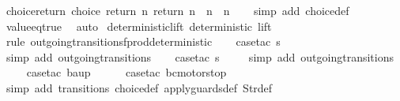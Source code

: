 \begin{isabellebody}
%
\isadelimproof
\isanewline
%
\endisadelimproof
\isanewline
{}\isamarkupfalse%
\ choice{\isacharunderscore}return{\isacharcolon}\ {\isachardoublequoteopen}choice\ {\isacharparenleft}return\ n{\isacharparenright}\ {\isacharparenleft}return\ n{\isacharprime}{\isacharparenright}\ {\isasymLongrightarrow}\ n\ {\isacharequal}\ n{\isacharprime}{\isachardoublequoteclose}\isanewline
%
\isadelimproof
\ \ %
\endisadelimproof
%
\isatagproof
{}\isamarkupfalse%
\ {\isacharparenleft}simp\ add{\isacharcolon}\ choice{\isacharunderscore}def{\isacharparenright}\isanewline
\ \ \isamarkupfalse%
\ value{\isacharunderscore}eq{\isacharunderscore}true\ \isamarkupfalse%
\ auto%
\endisatagproof
{\isafoldproof}%
%
\isadelimproof
\isanewline
%
\endisadelimproof
\isanewline
{}\isamarkupfalse%
\ deterministic{\isacharunderscore}lift{\isacharcolon}\ {\isachardoublequoteopen}deterministic\ lift{\isachardoublequoteclose}\isanewline
%
\isadelimproof
\ \ %
\endisadelimproof
%
\isatagproof
{}\isamarkupfalse%
\ {\isacharparenleft}rule\ outgoing{\isacharunderscore}transitions{\isacharunderscore}fprod{\isacharunderscore}deterministic{\isacharparenright}\isanewline
\ \ \isamarkupfalse%
\ {\isacharparenleft}case{\isacharunderscore}tac\ {\isachardoublequoteopen}s{\isacharequal}{}{\isachardoublequoteclose}{\isacharparenright}\isanewline
\ \ \ \isamarkupfalse%
\ {\isacharparenleft}simp\ add{\isacharcolon}\ outgoing{\isacharunderscore}transitions{\isacharunderscore}{}{\isacharparenright}\isanewline
\ \ \isamarkupfalse%
\ {\isacharparenleft}case{\isacharunderscore}tac\ {\isachardoublequoteopen}s{\isacharequal}{}{\isachardoublequoteclose}{\isacharparenright}\isanewline
\ \ \ \isamarkupfalse%
\ {\isacharparenleft}simp\ add{\isacharcolon}\ outgoing{\isacharunderscore}transitions{\isacharunderscore}{}{\isacharparenright}\isanewline
\ \ \ \isamarkupfalse%
\ {\isacharparenleft}case{\isacharunderscore}tac\ {\isachardoublequoteopen}ba{\isacharequal}up{}{}{\isachardoublequoteclose}{\isacharparenright}\isanewline
\ \ \ \ \isamarkupfalse%
\ {\isacharparenleft}case{\isacharunderscore}tac\ {\isachardoublequoteopen}bc{\isacharequal}motorstop\ {}{\isachardoublequoteclose}{\isacharparenright}\isanewline
\ \ \ \ \ \isamarkupfalse%
\ {\isacharparenleft}simp\ add{\isacharcolon}\ transitions\ choice{\isacharunderscore}def\ apply{\isacharunderscore}guards{\isacharunderscore}def\ Str{\isacharunderscore}def{\isacharparenright}\isanewline

\end{isabellebody}
